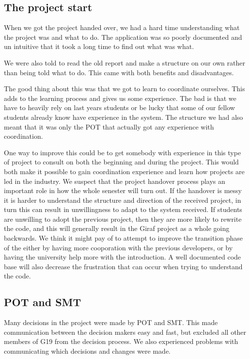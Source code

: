\subsection{The project start}
When we got the project handed over, we had a hard time understanding what the project was and what to do. The application was so poorly documented and un intuitive that it took a long time to find out what was what.

We were also told to read the old report and make a structure on our own rather than being told what to do. This came with both benefits and disadvantages.

The good thing about this was that we got to learn to coordinate ourselves. This adds to the learning process and gives us some experience. The bad is that we have to heavily rely on last years students or be lucky that some of our fellow students already know have experience in the system. The structure we had also meant that it was only the \gls{POT} that actually got any experience with coordination. 

One way to improve this could be to get somebody with experience in this type of project to consult on both the beginning and during the project. This would both make it possible to gain coordination experience and learn how projects are led in the industry. We suspect that the project handover process plays an important role in how the whole senester will turn out. If the handover is messy it is harder to understand the structure and direction of the received project, in turn this can result in unwillingness to adapt to the system received. If students are unwilling to adopt the previous project, then they are more likely to rewrite the code, and this will generally result in the Giraf project as a whole going backwards. We think it might pay of to attempt to improve the transition phase of the either by having more cooporation with the previous developers, or by having the university help more with the introduction. A well documented code base will also decrease the frustration that can occur when trying to understand the code.

\subsection{\gls{POT} and \gls{SMT}}
Many decisions in the project were made by \gls{POT} and \gls{SMT}. This made communication between the decision makers easy and fast, but excluded all other members of \gls{G19} from the decision process. We also experienced problems with communicating which decisions and changes were made.

